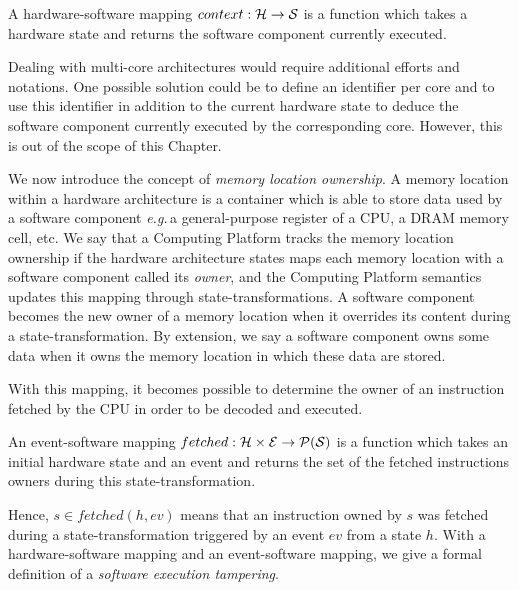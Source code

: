 \begin{definition}
  \label{def:hardsoftmap}
  A hardware-software mapping $con\-text : \mathcal{H} \rightarrow \mathcal{S}$ is a
  function which takes a hardware state and returns the software component
  currently executed.
\end{definition}

Dealing with multi-core architectures would require additional efforts and
notations. One possible solution could be to define an identifier per core and
to use this identifier in addition to the current hardware state to deduce the
software component currently executed by the corresponding core. However, this
is out of the scope of this Chapter.

We now introduce the concept of \textit{memory location ownership}. A memory
location within a hardware architecture is a container which is able to store
data used by a software component \emph{e.g.}\,a general-purpose register of a
CPU, a DRAM memory cell, etc. We say that a Computing Platform tracks the memory
location ownership if the hardware architecture states maps each memory location
with a software component called its \emph{owner}, and the Computing Platform
semantics updates this mapping through state-transformations. A software
component becomes the new owner of a memory location when it overrides its
content during a state-transformation. By extension, we say a software component
owns some data when it owns the memory location in which these data are stored.

With this mapping, it becomes possible to determine the owner of an instruction
fetched by the CPU in order to be decoded and executed.

\begin{definition}
  \label{def:evsoft}
  An event-software mapping
  $fet\-ched: \mathcal{H} \times \mathcal{E} \rightarrow \mathcal{P}(\mathcal{S})$ is a
  function which takes an initial hardware state and an event and returns the
  set of the fetched instructions owners during this state-transformation.
\end{definition}

Hence, $s \in fetched(h, ev)$ means that an instruction owned by $s$ was fetched
during a state-transformation triggered by an event $ev$ from a state $h$. With
a hardware-software mapping and an event-software mapping, we give a formal
definition of a \textit{software execution tampering}.

